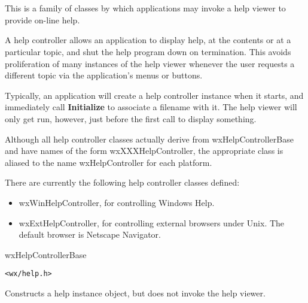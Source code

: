 \section{}\label{wxhelpcontroller}

This is a family of classes by which
applications may invoke a help viewer to provide on-line help.

A help controller allows an application to display help, at the contents
or at a particular topic, and shut the help program down on termination.
This avoids proliferation of many instances of the help viewer whenever the
user requests a different topic via the application's menus or buttons.

Typically, an application will create a help controller instance
when it starts, and immediately call {\bf Initialize}\rtfsp
to associate a filename with it. The help viewer will only get run, however,
just before the first call to display something.

Although all help controller classes actually derive from wxHelpControllerBase and have
names of the form wxXXXHelpController, the
appropriate class is aliased to the name wxHelpController for each platform.

There are currently the following help controller classes defined:

\begin{itemize}\itemsep=0pt
\item wxWinHelpController, for controlling Windows Help.
\item wxExtHelpController, for controlling external browsers under Unix.
The default browser is Netscape Navigator.
\end{itemize}


wxHelpControllerBase\\


{\tt <wx/help.h>}




Constructs a help instance object, but does not invoke the help viewer.



